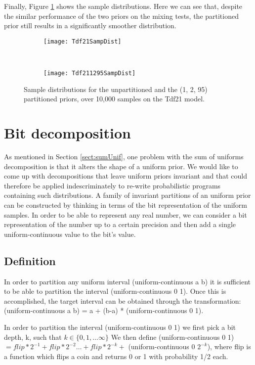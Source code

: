 Finally, Figure \ref{fig:tdf21PSampDist} shows the sample distributions. Here we can see that, despite the similar performance of the two priors on the mixing tests, the partitioned prior still results in a significantly smoother distribution.

\begin{figure}[h]
    \centering
    \begin{subfigure}[t]{0.48\textwidth}
      \texttt{[image: Tdf21SampDist]}
    \end{subfigure}
    ~
    \begin{subfigure}[t]{0.48\textwidth}
      \texttt{[image: Tdf211295SampDist]}
    \end{subfigure}
    \caption{Sample distributions for the unpartitioned and the (1, 2, 95) partitioned priors, over 10,000 samples on the Tdf21 model.}
    \label{fig:tdf21PSampDist}
\end{figure}

\section{Bit decomposition}
\label{sect:bitDecomp}
As mentioned in Section \ref{sect:sumUnif}, one problem with the sum of uniforms decomposition is that it alters the shape of a uniform prior. We would like to come up with decompositions that leave uniform priors invariant and that could therefore be applied indescriminately to re-write probabilistic programs containing such distributions. A family of invariant partitions of an uniform prior can be constructed by thinking in terms of the bit representation of the uniform samples. In order to be able to represent any real number, we can consider a bit representation of the number up to a certain precision and then add a single uniform-continuous value to the bit's value. 

\subsection{Definition}
In order to partition any uniform interval (uniform-continuous a b) it is sufficient to be able to partition the interval (uniform-continuous 0 1). Once this is accomplished, the target interval can be obtained through the transformation: (uniform-continuous a b) = a + (b-a) * (uniform-continuous 0 1).

In order to partition the interval (uniform-continuous 0 1) we first pick a bit depth, k, such that $ k \in \{ 0, 1, \ldots \infty \} $ We then define (uniform-continuous 0 1) $= flip*2^{-1} + flip*2^{-2} \ldots + flip*2^{-k} +$ (uniform-continuous 0 $2^{-k}$), where flip is a function which flips a coin and returns 0 or 1 with probability 1/2 each.

